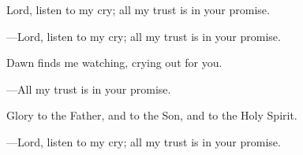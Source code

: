 \responsory
\begin{hangpar}

Lord, listen to my cry; all my trust is in your promise.

{\color{red}---\thinspace}Lord, listen to my cry; all my trust is in your promise.

\medskip Dawn finds me watching, crying out for you.

{\color{red}---\thinspace}All my trust is in your promise.

\medskip Glory to the Father, and to the Son, and to the Holy Spirit.

{\color{red}---\thinspace}Lord, listen to my cry; all my trust is in your promise.
\end{hangpar}
